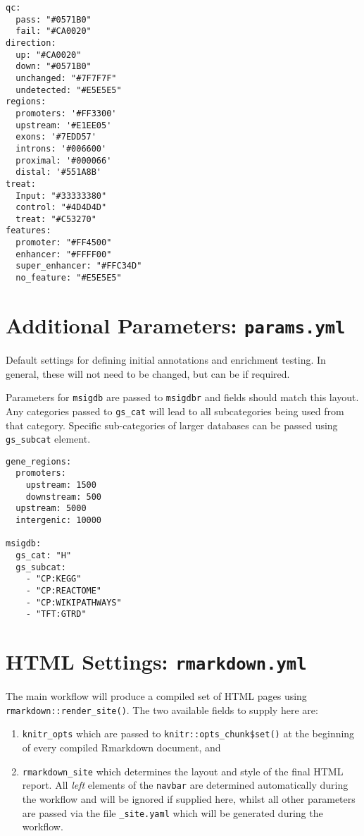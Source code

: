 \documentclass[
]{book}
\providecommand{\tightlist}{%
  \setlength{\itemsep}{0pt}\setlength{\parskip}{0pt}}
\begin{document}
\begin{verbatim}
qc:
  pass: "#0571B0"
  fail: "#CA0020"
direction:
  up: "#CA0020"
  down: "#0571B0"
  unchanged: "#7F7F7F"
  undetected: "#E5E5E5"
regions:
  promoters: '#FF3300'
  upstream: '#E1EE05'
  exons: '#7EDD57'
  introns: '#006600'
  proximal: '#000066'
  distal: '#551A8B'
treat:
  Input: "#33333380"
  control: "#4D4D4D"
  treat: "#C53270"
features:
  promoter: "#FF4500"
  enhancer: "#FFFF00"
  super_enhancer: "#FFC34D"
  no_feature: "#E5E5E5"
\end{verbatim}

\hypertarget{params-yml}{%
\section{\texorpdfstring{Additional Parameters: \texttt{params.yml}}{Additional Parameters: params.yml}}\label{params-yml}}

Default settings for defining initial annotations and enrichment testing.
In general, these will not need to be changed, but can be if required.

Parameters for \texttt{msigdb}\citep{msigdb} are passed to \texttt{msigdbr}\citep{msigdbr} and fields should match this layout.
Any categories passed to \texttt{gs\_cat} will lead to all subcategories being used from that category.
Specific sub-categories of larger databases can be passed using \texttt{gs\_subcat} element.

\begin{verbatim}
gene_regions:
  promoters:
    upstream: 1500
    downstream: 500
  upstream: 5000
  intergenic: 10000

msigdb:
  gs_cat: "H"
  gs_subcat:
    - "CP:KEGG"
    - "CP:REACTOME"
    - "CP:WIKIPATHWAYS"
    - "TFT:GTRD"
\end{verbatim}

\hypertarget{rmarkdown-yml}{%
\section{\texorpdfstring{HTML Settings: \texttt{rmarkdown.yml}}{HTML Settings: rmarkdown.yml}}\label{rmarkdown-yml}}

The main workflow will produce a compiled set of HTML pages using \texttt{rmarkdown::render\_site()}\citep{R-rmarkdown}.
The two available fields to supply here are:

\begin{enumerate}
\def\labelenumi{\arabic{enumi}.}
\tightlist
\item
  \texttt{knitr\_opts} which are passed to \texttt{knitr::opts\_chunk\$set()}\citep{R-knitr} at the beginning of every compiled Rmarkdown document, and
\item
  \texttt{rmarkdown\_site} which determines the layout and style of the final HTML report.
  All \emph{left} elements of the \texttt{navbar} are determined automatically during the workflow and will be ignored if supplied here, whilst all other parameters are passed via the file \texttt{\_site.yaml} which will be generated during the workflow.
\end{enumerate}
\end{document}
